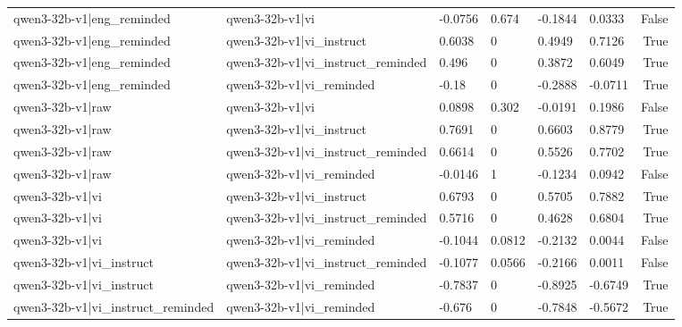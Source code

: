 \begin{table}
\begin{tabular}{llllllr}
qwen3-32b-v1|eng_reminded & qwen3-32b-v1|vi & -0.0756 & 0.674 & -0.1844 & 0.0333 & False \\
qwen3-32b-v1|eng_reminded & qwen3-32b-v1|vi_instruct & 0.6038 & 0 & 0.4949 & 0.7126 & True \\
qwen3-32b-v1|eng_reminded & qwen3-32b-v1|vi_instruct_reminded & 0.496 & 0 & 0.3872 & 0.6049 & True \\
qwen3-32b-v1|eng_reminded & qwen3-32b-v1|vi_reminded & -0.18 & 0 & -0.2888 & -0.0711 & True \\
qwen3-32b-v1|raw & qwen3-32b-v1|vi & 0.0898 & 0.302 & -0.0191 & 0.1986 & False \\
qwen3-32b-v1|raw & qwen3-32b-v1|vi_instruct & 0.7691 & 0 & 0.6603 & 0.8779 & True \\
qwen3-32b-v1|raw & qwen3-32b-v1|vi_instruct_reminded & 0.6614 & 0 & 0.5526 & 0.7702 & True \\
qwen3-32b-v1|raw & qwen3-32b-v1|vi_reminded & -0.0146 & 1 & -0.1234 & 0.0942 & False \\
qwen3-32b-v1|vi & qwen3-32b-v1|vi_instruct & 0.6793 & 0 & 0.5705 & 0.7882 & True \\
qwen3-32b-v1|vi & qwen3-32b-v1|vi_instruct_reminded & 0.5716 & 0 & 0.4628 & 0.6804 & True \\
qwen3-32b-v1|vi & qwen3-32b-v1|vi_reminded & -0.1044 & 0.0812 & -0.2132 & 0.0044 & False \\
qwen3-32b-v1|vi_instruct & qwen3-32b-v1|vi_instruct_reminded & -0.1077 & 0.0566 & -0.2166 & 0.0011 & False \\
qwen3-32b-v1|vi_instruct & qwen3-32b-v1|vi_reminded & -0.7837 & 0 & -0.8925 & -0.6749 & True \\
qwen3-32b-v1|vi_instruct_reminded & qwen3-32b-v1|vi_reminded & -0.676 & 0 & -0.7848 & -0.5672 & True \\
\bottomrule
\end{tabular}
\end{table}
